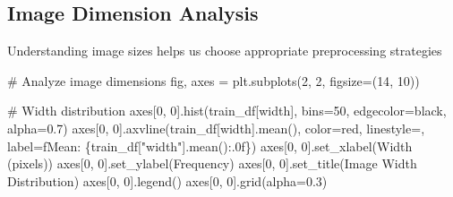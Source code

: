 \documentclass[
  letterpaper,
  DIV=11,
  numbers=noendperiod]{scrartcl}
\newenvironment{Shaded}{\begin{snugshade}}{\end{snugshade}}
\newcommand{\CommentTok}[1]{\textcolor[rgb]{0.37,0.37,0.37}{#1}}
\newcommand{\DecValTok}[1]{\textcolor[rgb]{0.68,0.00,0.00}{#1}}
\newcommand{\FloatTok}[1]{\textcolor[rgb]{0.68,0.00,0.00}{#1}}
\newcommand{\NormalTok}[1]{\textcolor[rgb]{0.00,0.23,0.31}{#1}}
\newcommand{\OperatorTok}[1]{\textcolor[rgb]{0.37,0.37,0.37}{#1}}
\newcommand{\SpecialCharTok}[1]{\textcolor[rgb]{0.37,0.37,0.37}{#1}}
\newcommand{\SpecialStringTok}[1]{\textcolor[rgb]{0.13,0.47,0.30}{#1}}
\newcommand{\StringTok}[1]{\textcolor[rgb]{0.13,0.47,0.30}{#1}}
\renewenvironment{Shaded}{%
  \begin{tcolorbox}[%
    enhanced,%
    colback=codebg,%
    colframe=codebg,%
    borderline west={3pt}{0pt}{sectionblue},%
    boxrule=0pt,%
    arc=0pt,%
    boxsep=5pt,%
    left=2mm,%
    right=2mm,%
    top=2mm,%
    bottom=2mm%
  ]%
}{%
  \end{tcolorbox}%
}
\begin{document}
\subsection{Image Dimension Analysis}\label{image-dimension-analysis}

Understanding image sizes helps us choose appropriate preprocessing
strategies

\begin{Shaded}
\begin{Highlighting}[]
\CommentTok{\# Analyze image dimensions}
\NormalTok{fig, axes }\OperatorTok{=}\NormalTok{ plt.subplots(}\DecValTok{2}\NormalTok{, }\DecValTok{2}\NormalTok{, figsize}\OperatorTok{=}\NormalTok{(}\DecValTok{14}\NormalTok{, }\DecValTok{10}\NormalTok{))}

\CommentTok{\# Width distribution}
\NormalTok{axes[}\DecValTok{0}\NormalTok{, }\DecValTok{0}\NormalTok{].hist(train\_df[}\StringTok{\textquotesingle{}width\textquotesingle{}}\NormalTok{], bins}\OperatorTok{=}\DecValTok{50}\NormalTok{, edgecolor}\OperatorTok{=}\StringTok{\textquotesingle{}black\textquotesingle{}}\NormalTok{, alpha}\OperatorTok{=}\FloatTok{0.7}\NormalTok{)}
\NormalTok{axes[}\DecValTok{0}\NormalTok{, }\DecValTok{0}\NormalTok{].axvline(train\_df[}\StringTok{\textquotesingle{}width\textquotesingle{}}\NormalTok{].mean(), color}\OperatorTok{=}\StringTok{\textquotesingle{}red\textquotesingle{}}\NormalTok{, linestyle}\OperatorTok{=}\StringTok{\textquotesingle{}{-}{-}\textquotesingle{}}\NormalTok{, }
\NormalTok{                   label}\OperatorTok{=}\SpecialStringTok{f\textquotesingle{}Mean: }\SpecialCharTok{\{}\NormalTok{train\_df[}\StringTok{"width"}\NormalTok{]}\SpecialCharTok{.}\NormalTok{mean()}\SpecialCharTok{:.0f\}}\SpecialStringTok{\textquotesingle{}}\NormalTok{)}
\NormalTok{axes[}\DecValTok{0}\NormalTok{, }\DecValTok{0}\NormalTok{].set\_xlabel(}\StringTok{\textquotesingle{}Width (pixels)\textquotesingle{}}\NormalTok{)}
\NormalTok{axes[}\DecValTok{0}\NormalTok{, }\DecValTok{0}\NormalTok{].set\_ylabel(}\StringTok{\textquotesingle{}Frequency\textquotesingle{}}\NormalTok{)}
\NormalTok{axes[}\DecValTok{0}\NormalTok{, }\DecValTok{0}\NormalTok{].set\_title(}\StringTok{\textquotesingle{}Image Width Distribution\textquotesingle{}}\NormalTok{)}
\NormalTok{axes[}\DecValTok{0}\NormalTok{, }\DecValTok{0}\NormalTok{].legend()}
\NormalTok{axes[}\DecValTok{0}\NormalTok{, }\DecValTok{0}\NormalTok{].grid(alpha}\OperatorTok{=}\FloatTok{0.3}\NormalTok{)}


\end{Highlighting}
\end{Shaded}
\end{document}
